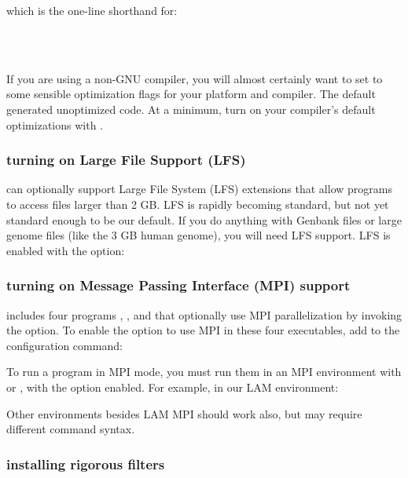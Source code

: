 which is the one-line shorthand for:

\\
\\

If you are using a non-GNU compiler, you will almost certainly want to
set  to some sensible optimization flags for your
platform and compiler. The  default generated unoptimized
code. At a minimum, turn on your compiler's default optimizations with
.

\subsubsection{turning on Large File Support (LFS)}

 can optionally support Large File System (LFS)
extensions that allow programs to access files larger than 2 GB. LFS
is rapidly becoming standard, but not yet standard enough to be our
default. If you do anything with Genbank files or large genome files
(like the 3 GB human genome), you will need LFS support.  LFS is
enabled with the  option:


\subsubsection{turning on Message Passing Interface (MPI) support}

 includes four programs , ,
 and  that optionally use MPI
parallelization by invoking the  option. 
To enable the option to use MPI in these four executables, add 
 to the configuration command:


To run a program in MPI mode, you must run them 
in an MPI environment with  or , with 
the  option enabled.  For example, 
in our LAM environment:


Other environments besides LAM MPI should work also, but may
require different command syntax.

\subsubsection{installing rigorous filters}

